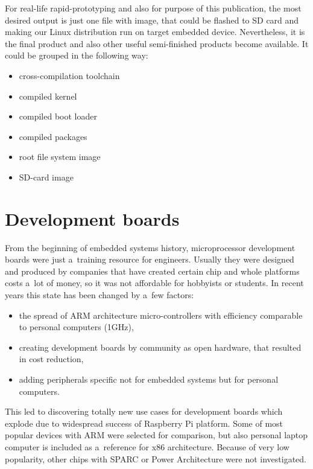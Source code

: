\documentclass[printmode]{mgr}
\begin{document}
For real-life rapid-prototyping and also for purpose of this publication, the most desired output is just one file with image, that could be flashed to SD card and making our Linux distribution run on target embedded device.
Nevertheless, it is the final product and also other useful semi-finished products become available.
It could be grouped in the following way:

\begin{itemize}
    \itemsep0em
    \item cross-compilation toolchain
    \item compiled kernel
    \item compiled boot loader
    \item compiled packages
    \item root file system image
    \item SD-card image
\end{itemize}



















\chapter{Development boards}
\label{section:development-boards}

From the beginning of embedded systems history, microprocessor development boards were just a~training resource for engineers.
Usually they were designed and produced by companies that have created certain chip and whole platforms costs a~lot of money, so it was not affordable for hobbyists or students.
In recent years this state has been changed by a~few factors:
\begin{itemize}
  \itemsep0em
  \item the spread of ARM architecture micro-controllers with efficiency comparable to personal computers (1GHz),
  \item creating development boards by community as open hardware, that resulted in cost reduction,
  \item adding peripherals specific not for embedded systems but for personal computers.
\end{itemize}
This led to discovering totally new use cases for development boards which explode due to widespread success of Raspberry Pi platform.
Some of most popular devices with ARM were selected for comparison, but also personal laptop computer is included as a~reference for x86 architecture. Because of very low popularity, other chips with SPARC or Power Architecture were not investigated.
\end{document}
